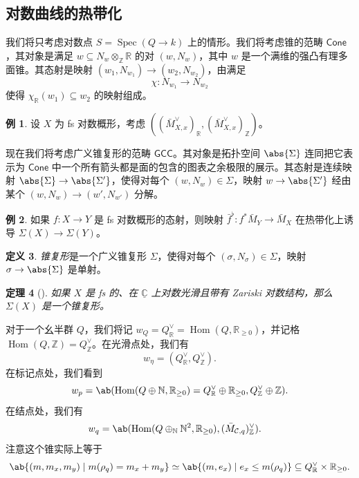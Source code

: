 \documentclass{amsart}
\newtheorem{thm}{定理}[section]
\theoremstyle{definition}
\newtheorem{defn}[thm]{定义}
\newtheorem{exm}[thm]{例}
\theoremstyle{remark}
\theoremstyle{plain}
\theoremstyle{definition}
\theoremstyle{remark}
\newcommand{\N}{\mathbb{N}}
\newcommand{\R}{\mathbb{R}}
\newcommand{\C}{\mathbb{C}}
\newcommand{\Z}{\mathbb{Z}}
\newcommand{\mc}[1]{\mathcal{#1}}
\newcommand{\ms}[1]{\mathsf{#1}}
\newcommand{\ul}[1]{\underline{#1}}
\newcommand{\1}{\mathbf{1}}
\newcommand{\2}{\mathbf{2}}
\newcommand{\3}{\mathbf{3}}
\DeclareMathOperator{\Hom}{Hom}
\DeclareMathOperator{\Spec}{Spec}
\begin{document}
\subsection{对数曲线的热带化}%
\label{sub:Tropicalization of log curves}

我们将只考虑对数点 \(S = \Spec(Q \to k)\) 上的情形。我们将考虑锥的范畴 \(\ms{Cone}\)，其对象是满足 \(w \subseteq N_w \otimes_{\Z} \R\) 的对 \((w, N_w)\)，其中 \(w\) 是一个满维的强凸有理多面锥。其态射是映射 \((w_1, N_{w_1}) \to (w_2, N_{w_2})\)，由满足
\[ \chi \colon N_{w_1} \to N_{w_2} \]
使得 \(\chi_{\R}(w_1) \subseteq w_2\) 的映射组成。

\begin{exm}
    设 \(X\) 为 fs 对数概形，考虑 \(( (\bar{M}_{X,x}^{\vee})_{\R}, (\bar{M}_{X,x}^{\vee})_{\Z} )\)。
\end{exm}

现在我们将考虑广义锥复形的范畴 \(\ms{GCC}\)。其对象是拓扑空间 \(\abs{\Sigma}\) 连同把它表示为 \(\ms{Cone}\) 中一个所有箭头都是面的包含的图表之余极限的展示。其态射是连续映射 \(\abs{\Sigma} \to \abs{\Sigma'}\)，使得对每个 \((w, N_w) \in \Sigma\)，映射 \(w \to \abs{\Sigma'}\) 经由某个 \((w, N_w) \to (w', N_{w'})\) 分解。

\begin{exm}
    如果 \(f \colon X \to Y\) 是 fs 对数概形的态射，则映射 \(\bar{f}^{\flat} \colon f^* \bar{M}_Y \to \bar{M}_X\) 在热带化上诱导 \(\Sigma(X) \to \Sigma(Y)\)。
\end{exm}

\begin{defn}
    \textit{锥复形}是一个广义锥复形 \(\Sigma\)，使得对每个 \((\sigma, N_{\sigma}) \in \Sigma\)，映射 \(\sigma \to \abs{\Sigma}\) 是单射。
\end{defn}

\begin{thm}[{\cite{ACP2015}}]
    如果 \(X\) 是 fs 的、在 \(\ul{\C}\) 上对数光滑且带有 Zariski 对数结构，那么 \(\Sigma(X)\) 是一个锥复形。
\end{thm}

对于一个幺半群 \(Q\)，我们将记 \(w_Q = Q_{\R}^{\vee} = \Hom(Q, \R_{\geq 0})\)，并记格 \(\Hom(Q, \Z) = Q_{\Z}^{\vee}\)。在光滑点处，我们有
\[ w_{\eta} = (Q_{\R}^{\vee}, Q_{\Z}^{\vee}). \]
在标记点处，我们看到
\[ w_p = \ab(\Hom (Q \oplus \N, \R_{\geq 0}) = Q_{\R}^{\vee} \oplus \R_{\geq 0}, Q_{\Z}^{\vee}\oplus \Z). \]
在结点处，我们有
\begin{align*}
    w_q &= \ab(\Hom(Q \oplus_{\N} \N^2, \R_{\geq 0}), ( \bar{M}_{\mc{C}, q} )_{\Z}^{\vee}).
\end{align*}
注意这个锥实际上等于
\[ \ab\{(m, m_x, m_y) \mid m(\rho_q) = m_x + m_y \} \simeq \ab\{(m, e_x) \mid e_x \leq m(\rho_q) \} \subseteq Q_{\R}^{\vee} \times \R_{\geq 0}. \]
\end{document}
